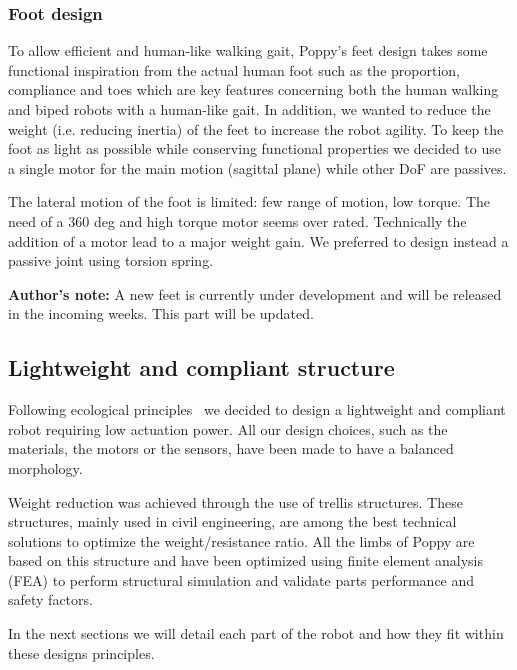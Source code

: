 \subsubsection{Foot design} %

To allow efficient and human-like walking gait, Poppy's feet design takes some functional inspiration from the actual human foot such as the proportion, compliance and toes which are key features concerning both the human walking and biped robots with a human-like gait. In addition, we wanted to reduce the weight (i.e. reducing inertia) of the feet to increase the robot agility. To keep the foot as light as possible while conserving functional properties we decided to use a single motor for the main motion (sagittal plane) while other DoF are passives.

The lateral motion of the foot is limited: few range of motion, low torque. The need of a 360 deg and high torque motor seems over rated. Technically the addition of a motor lead to a major weight gain. We preferred to design  instead a passive joint using torsion spring.

\textbf{Author's note:} A new feet is currently under development and will be released in the incoming weeks. This part will be updated.

\subsection{Lightweight and compliant structure} %
Following ecological principles~\cite{pfeifer2005new} we decided to design a lightweight and compliant robot requiring low actuation power. All our design choices, such as the materials, the motors or the sensors, have been made to have a balanced morphology.

Weight reduction was achieved through the use of trellis structures. These structures, mainly used in civil engineering, are among the best technical solutions to optimize the weight/resistance ratio. All the limbs of Poppy are based on this structure and have been optimized using finite element analysis (FEA) to perform structural simulation and validate parts performance and safety factors.

In the next sections we will detail each part of the robot and how they fit within these designs principles.


